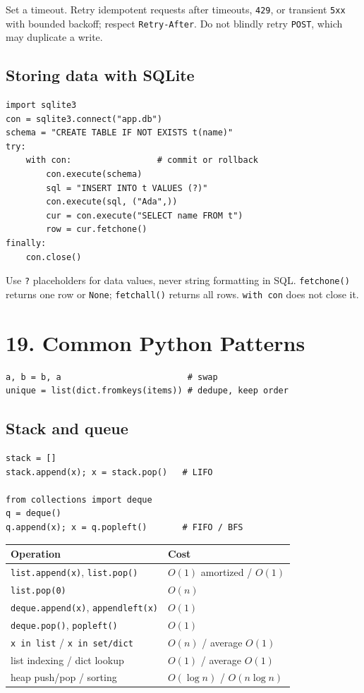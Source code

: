 \documentclass[10pt,a4paper]{article}
\newcommand{\py}[1]{\texttt{#1}}
\newenvironment{tbl}{\par\begin{lrbox}{\tblbox}\begin{minipage}{\linewidth}\compacttable}%
  {\end{minipage}\end{lrbox}\noindent\raisebox{\dp\tblbox}{\usebox{\tblbox}}\par}
\newcommand{\compacttable}{\fontsize{10}{11.2}\selectfont\setlength{\tabcolsep}{2.5pt}\renewcommand{\arraystretch}{1.08}}
\begin{document}
\begin{multicols}{2}
Set a timeout. Retry idempotent requests after timeouts, \py{429}, or transient \py{5xx} with bounded backoff; respect \py{Retry-After}. Do not blindly retry \py{POST}, which may duplicate a write.

\subsection{Storing data with SQLite}

\begin{lstlisting}
import sqlite3
con = sqlite3.connect("app.db")
schema = "CREATE TABLE IF NOT EXISTS t(name)"
try:
    with con:                 # commit or rollback
        con.execute(schema)
        sql = "INSERT INTO t VALUES (?)"
        con.execute(sql, ("Ada",))
        cur = con.execute("SELECT name FROM t")
        row = cur.fetchone()
finally:
    con.close()
\end{lstlisting}

Use \py{?} placeholders for data values, never string formatting in SQL. \py{fetchone()} returns one row or \py{None}; \py{fetchall()} returns all rows. \py{with con} does not close it.

\section{19. Common Python Patterns}

\begin{lstlisting}
a, b = b, a                         # swap
unique = list(dict.fromkeys(items)) # dedupe, keep order
\end{lstlisting}

\subsection{Stack and queue}

\begin{lstlisting}
stack = []
stack.append(x); x = stack.pop()   # LIFO

from collections import deque
q = deque()
q.append(x); x = q.popleft()       # FIFO / BFS
\end{lstlisting}

\begin{tbl}
\begin{tabularx}{\linewidth}{@{}R{.49\linewidth}L@{}}
\toprule
\textbf{Operation} & \textbf{Cost} \\
\midrule
\py{list.append(x)}, \py{list.pop()} & $O(1)$ amortized / $O(1)$ \\
\py{list.pop(0)} & $O(n)$ \\
\py{deque.append(x)}, \py{appendleft(x)} & $O(1)$ \\
\py{deque.pop()}, \py{popleft()} & $O(1)$ \\
\py{x in list} / \py{x in set/dict} & $O(n)$ / average $O(1)$ \\
list indexing / dict lookup & $O(1)$ / average $O(1)$ \\
heap push/pop / sorting & $O(\log n)$ / $O(n\log n)$ \\
\bottomrule
\end{tabularx}
\end{tbl}


\end{multicols}
\end{document}
